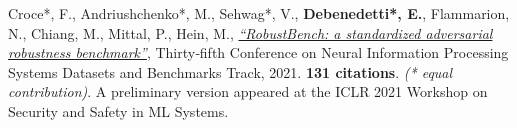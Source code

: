 




\begin{cvparagraph}
\vspace{5.0mm}
\begin{cvitems}
    \item Croce*, F., Andriushchenko*, M., Sehwag*, V., \textbf{Debenedetti*, E.}, Flammarion, N., Chiang, M., Mittal, P., Hein, M., \textit{\href{https://openreview.net/forum?id=SSKZPJCt7B}{``RobustBench: a standardized adversarial robustness benchmark''}}, Thirty‑fifth Conference on Neural Information Processing Systems Datasets and Benchmarks Track, 2021. \textbf{131 citations}. \textit{(* equal contribution)}. A preliminary version appeared at the ICLR 2021 Workshop on Security and Safety in ML Systems.
\end{cvitems}
\end{cvparagraph}
\vspace{2.5mm}
